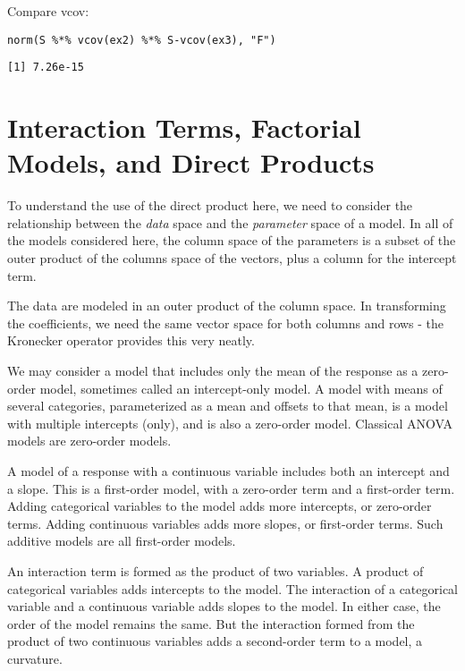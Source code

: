 \documentclass[]{article}
\begin{document}
Compare vcov:

\begin{verbatim}
norm(S %*% vcov(ex2) %*% S-vcov(ex3), "F")
\end{verbatim}

\begin{verbatim}
[1] 7.26e-15
\end{verbatim}

\hypertarget{interaction-terms-factorial-models-and-direct-products}{%
\section{Interaction Terms, Factorial Models, and Direct
Products}\label{interaction-terms-factorial-models-and-direct-products}}

To understand the use of the direct product here, we need to consider
the relationship between the \emph{data} space and the \emph{parameter}
space of a model. In all of the models considered here, the column space
of the parameters is a subset of the outer product of the columns space
of the vectors, plus a column for the intercept term.

The data are modeled in an outer product of the column space. In
transforming the coefficients, we need the same vector space for both
columns and rows - the Kronecker operator provides this very neatly.

We may consider a model that includes only the mean of the response as a
zero-order model, sometimes called an intercept-only model. A model with
means of several categories, parameterized as a mean and offsets to that
mean, is a model with multiple intercepts (only), and is also a
zero-order model. Classical ANOVA models are zero-order models.

A model of a response with a continuous variable includes both an
intercept and a slope. This is a first-order model, with a zero-order
term and a first-order term. Adding categorical variables to the model
adds more intercepts, or zero-order terms. Adding continuous variables
adds more slopes, or first-order terms. Such additive models are all
first-order models.

An interaction term is formed as the product of two variables. A product
of categorical variables adds intercepts to the model. The interaction
of a categorical variable and a continuous variable adds slopes to the
model. In either case, the order of the model remains the same. But the
interaction formed from the product of two continuous variables adds a
second-order term to a model, a curvature.
\end{document}
